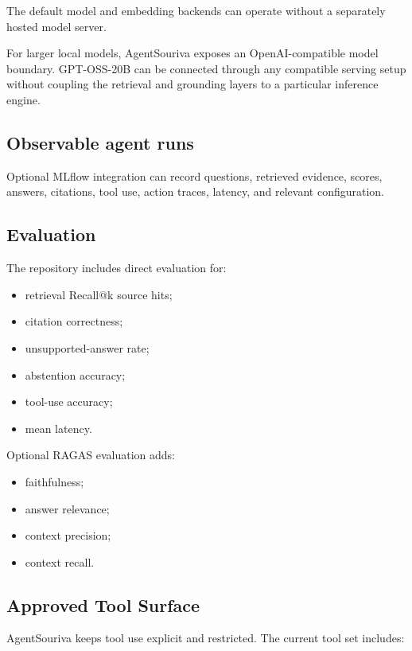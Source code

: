 The default model and embedding backends can operate without a separately hosted model server.

For larger local models, AgentSouriva exposes an OpenAI-compatible model boundary. GPT-OSS-20B can be connected through any compatible serving setup without coupling the retrieval and grounding layers to a particular inference engine.

\subsection{Observable agent runs}

Optional MLflow integration can record questions, retrieved evidence, scores, answers, citations, tool use, action traces, latency, and relevant configuration.

\subsection{Evaluation}

The repository includes direct evaluation for:

\begin{itemize}
\tightlist
\item
  retrieval Recall@k source hits;
\item
  citation correctness;
\item
  unsupported-answer rate;
\item
  abstention accuracy;
\item
  tool-use accuracy;
\item
  mean latency.
\end{itemize}

Optional RAGAS evaluation adds:

\begin{itemize}
\tightlist
\item
  faithfulness;
\item
  answer relevance;
\item
  context precision;
\item
  context recall.
\end{itemize}

\subsection{Approved Tool Surface}

AgentSouriva keeps tool use explicit and restricted. The current tool set includes:

